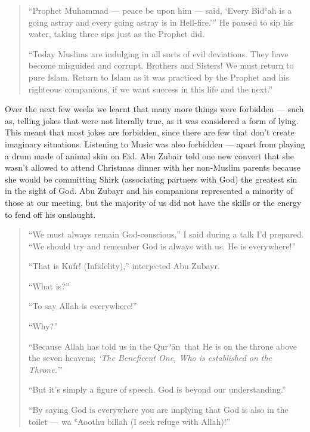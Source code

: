 \documentclass[12pt]{memoir}
\def\´{ʾ} %
\def\`{ʿ} %
\def \Quran{Qur\-\´ān} %
\def\–{-\hskip0pt}
\begin{document}
\begin{quote}
“Prophet Muhammad — peace be upon him — said,
‘Every Bid\`ah is a going astray and every going astray is in Hell-fire.’”
He paused to sip his water, taking three sips just as the Prophet did.

“Today Muslims are indulging in all sorts of evil deviations.
They have become misguided and corrupt.
Brothers and Sisters!
We must return to pure Islam.
Return to Islam as it was practiced by the Prophet
and his righteous companions,
if we want success in this life and the next.”
\end{quote}

Over the next few weeks we learnt that many more things were forbidden —
such as, telling jokes that were not literally true,
as it was considered a form of lying.
This meant that most jokes are forbidden,
since there are few that don’t create imaginary situations.
Listening to Music was also forbidden —
apart from playing a drum made of animal skin on Eid.
Abu Zubair told one new convert that she wasn’t allowed
to attend Christmas dinner with her non-Muslim parents
because she would be committing Shirk (associating partners with God)
the greatest sin in the sight of God.
Abu Zubayr and his companions represented a minority of those at our meeting,
but the majority of us did not have the skills
or the energy to fend off his onslaught.

\begin{quote}
“We must always remain God\–conscious,”
I said during a talk I’d prepared.
“We should try and remember God is always with us. He is everywhere!”

“That is Kufr! (Infidelity),” interjected Abu Zubayr.

“What is?”

“To say Allah is everywhere!”

“Why?”

“Because Allah has told us in the \Quran\
that He is on the throne above the seven heavens;
\emph{‘The Beneficent One, Who is established on the Throne.’}”

“But it’s simply a figure of speech.
God is beyond our understanding.”

“By saying God is everywhere you are implying that God is also in the toilet —
wa \`Aoothu billah (I seek refuge with Allah)!”
\end{quote}
\end{document}
